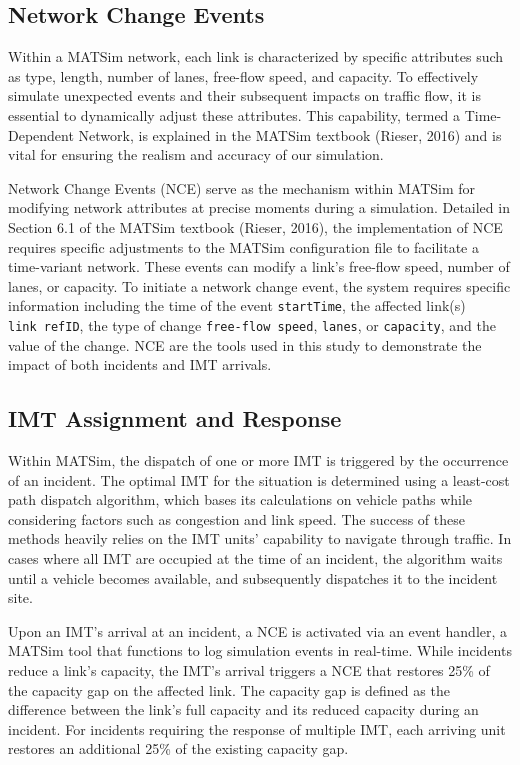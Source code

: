 \documentclass[fancy, oneside, mastersfancy, ms]{byuthesis}
\begin{document}
\hypertarget{sec-NCE}{%
\subsection{Network Change Events}\label{sec-NCE}}

Within a MATSim network, each link is characterized by specific
attributes such as type, length, number of lanes, free-flow speed, and
capacity. To effectively simulate unexpected events and their subsequent
impacts on traffic flow, it is essential to dynamically adjust these
attributes. This capability, termed a Time-Dependent Network, is
explained in the MATSim textbook (Rieser, 2016) and is vital for
ensuring the realism and accuracy of our simulation.

Network Change Events (NCE) serve as the mechanism within MATSim for
modifying network attributes at precise moments during a simulation.
Detailed in Section 6.1 of the MATSim textbook (Rieser, 2016), the
implementation of NCE requires specific adjustments to the MATSim
configuration file to facilitate a time-variant network. These events
can modify a link's free-flow speed, number of lanes, or capacity. To
initiate a network change event, the system requires specific
information including the time of the event \texttt{startTime}, the
affected link(s) \texttt{link\ refID}, the type of change
\texttt{free-flow\ speed}, \texttt{lanes}, or \texttt{capacity}, and the
value of the change. NCE are the tools used in this study to demonstrate
the impact of both incidents and IMT arrivals.

\hypertarget{sec-imt_response}{%
\subsection{IMT Assignment and Response}\label{sec-imt_response}}

Within MATSim, the dispatch of one or more IMT is triggered by the
occurrence of an incident. The optimal IMT for the situation is
determined using a least-cost path dispatch algorithm, which bases its
calculations on vehicle paths while considering factors such as
congestion and link speed. The success of these methods heavily relies
on the IMT units' capability to navigate through traffic. In cases where
all IMT are occupied at the time of an incident, the algorithm waits
until a vehicle becomes available, and subsequently dispatches it to the
incident site.

Upon an IMT's arrival at an incident, a NCE is activated via an event
handler, a MATSim tool that functions to log simulation events in
real-time. While incidents reduce a link's capacity, the IMT's arrival
triggers a NCE that restores 25\% of the capacity gap on the affected
link. The capacity gap is defined as the difference between the link's
full capacity and its reduced capacity during an incident. For incidents
requiring the response of multiple IMT, each arriving unit restores an
additional 25\% of the existing capacity gap.
\end{document}

